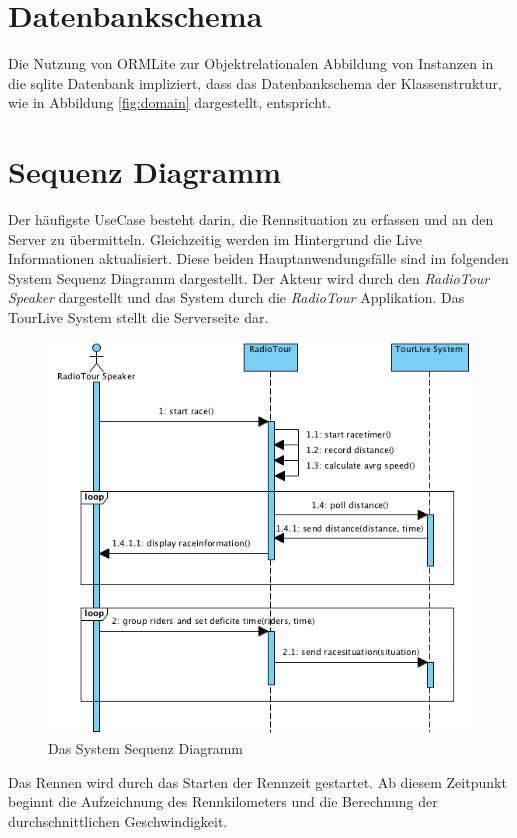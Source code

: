 \newpage

\section{Datenbankschema}
Die Nutzung von ORMLite zur Objektrelationalen Abbildung von Instanzen in die \gls{sqlite} Datenbank impliziert, dass das Datenbankschema der Klassenstruktur, wie in Abbildung \ref{fig:domain} dargestellt, entspricht. 

\section{Sequenz Diagramm}
Der häufigste UseCase besteht darin, die Rennsituation zu erfassen und an den Server zu übermitteln. Gleichzeitig werden im Hintergrund die Live Informationen aktualisiert. Diese beiden Hauptanwendungsfälle sind im folgenden System Sequenz Diagramm dargestellt. Der Akteur wird durch den \textit{RadioTour Speaker} dargestellt und das System durch die \textit{RadioTour} Applikation. Das TourLive System stellt die Serverseite dar.

\begin{figure}[h!]
\caption{Das System Sequenz Diagramm}
\label{fig:ssd_rennen}
\centering
\includegraphics[scale=0.9]{05bericht/images/ssd_rennen.png}
\end{figure} 

Das Rennen wird durch das Starten der Rennzeit gestartet. Ab diesem Zeitpunkt beginnt die Aufzeichnung des Rennkilometers und die Berechnung der durchschnittlichen Geschwindigkeit.
